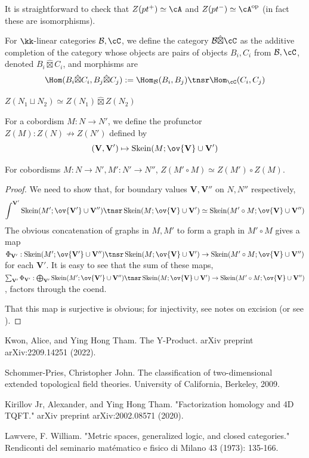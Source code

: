 \documentclass[12pt]{article}
\newcommand{\VV}{{\mathbf{V}}}
\DeclareMathOperator{\Skein}{Skein}
\newcommand{\op}{{\text{op}}}
\newcommand{\cB}{{\mathcal{B}}}
\newcommand{\hatbox}{{\hat{\boxtimes}}}
\begin{document}
It is straightforward to check that
$Z(pt^+) \simeq \cA$
and $Z(pt^-) \simeq \cA^\op$
(in fact these are isomorphisms).

\begin{definition}
For $\kk$-linear categories $\cB,\cC$,
we define the category $\cB \hatbox \cC$
as the additive completion of the category
whose objects are pairs of objects $B_i,C_i$ from $\cB,\cC$,
denoted $B_i \hatbox C_i$,
and morphisms are
\[
\Hom(B_i \hatbox C_i, B_j \hatbox C_j)
:=
\Hom_\cB(B_i, B_j) \tnsr \Hom_\cC(C_i, C_j)
\]
\end{definition}


\begin{proposition}
$Z(N_1 \sqcup N_2) \simeq Z(N_1) \hatbox Z(N_2)$
\end{proposition}

\begin{definition}
For a cobordism $M : N \to N'$,
we define the profunctor
$Z(M): Z(N) \nrightarrow Z(N')$
defined by
\[
(\VV, \VV') \mapsto \Skein(M; \ov{\VV} \cup \VV')
\]
\end{definition}

\begin{proposition}
\label{p:1-cobord-compose}
For cobordisms $M: N \to N', M': N' \to N''$,
$Z(M' \circ M) \simeq Z(M') \circ Z(M)$.
\end{proposition}

\begin{proof}
We need to show that, for boundary values
$\VV,\VV''$ on $N,N''$ respectively,
\[
\int^{\VV'} \Skein(M';\ov{\VV'} \cup \VV'')
\tnsr \Skein(M; \ov{\VV} \cup \VV')
\simeq \Skein(M' \circ M; \ov{\VV} \cup \VV'')
\]
The obvious concatenation of graphs
in $M,M'$ to form a graph in $M' \circ M$
gives a map
$\Phi_{\VV'}: \Skein(M';\ov{\VV'} \cup \VV'')
\tnsr \Skein(M; \ov{\VV} \cup \VV')
\to \Skein(M' \circ M; \ov{\VV} \cup \VV'')$
for each $\VV'$.
It is easy to see that the sum of these maps,
$\sum_{\VV'} \Phi_{\VV'}:
\bigoplus_{\VV'} \Skein(M';\ov{\VV'} \cup \VV'')
\tnsr \Skein(M; \ov{\VV} \cup \VV')
\to \Skein(M' \circ M; \ov{\VV} \cup \VV'')$,
factors through the coend.

That this map is surjective is obvious;
for injectivity, see notes on excision
(or see \cite{KT}).
\end{proof}


\begin{thebibliography}{1}

 Kwon, Alice, and Ying Hong Tham. The Y-Product. arXiv preprint arXiv:2209.14251 (2022).

 Schommer-Pries, Christopher John. The classification of two-dimensional extended topological field theories. University of California, Berkeley, 2009.

 Kirillov Jr, Alexander, and Ying Hong Tham. "Factorization homology and 4D TQFT." arXiv preprint arXiv:2002.08571 (2020).

 Lawvere, F. William. "Metric spaces, generalized logic, and closed categories." Rendiconti del seminario matématico e fisico di Milano 43 (1973): 135-166.

\end{thebibliography}
\end{document}
